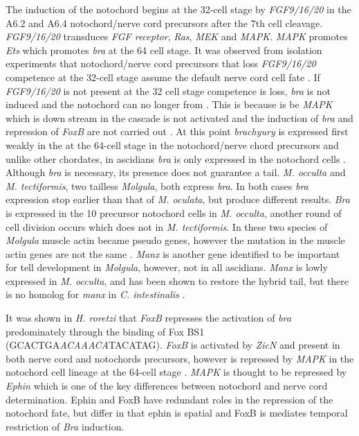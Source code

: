 The induction of the notochord begins at the 32-cell stage by \textit{FGF9/16/20} in the A6.2 and A6.4 notochord/nerve cord precursors\cite{satoh_ascidian_2001} after the 7th cell cleavage. \textit{FGF9/16/20} transduces \textit{FGF receptor}, \textit{Ras}, \textit{MEK} and \textit{MAPK}. \textit{MAPK} promotes \textit{Ets} which promotes \textit{bra} at the 64 cell stage. It was observed from isolation experiments that notochord/nerve cord precursors that loss \textit{FGF9/16/20} competence at the 32-cell stage assume the default nerve cord cell fate \cite{yasuo_conservation_1998,minokawa_binary_2001}. If \textit{FGF9/16/20} is not present at the 32 cell stage competence is loss, \textit{bra} is not induced and the notochord can no longer from \cite{nakatani_basic_1996,nakatani_duration_1999}. This is because is be \textit{MAPK} which is down stream in the cascade is not activated and the induction of \textit{bra} and repression of \textit{FoxB} are not carried out \cite{hashimoto_transcription_2011}. At this point \textit{brachyury} is expressed first weakly in the at the 64-cell stage in the notochord/nerve chord precursors \cite{yasuo_ascidian_1994} and unlike other chordates, in ascidians \textit{bra} is only expressed in the notochord cells \cite{yasuo_function_1993,corbo_characterization_1997,hotta_temporal_1999,takada_brachyury_2002}. Although \textit{bra} is necessary, its presence does not guarantee a tail. \textit{M. occulta} and \textit{M. tectiformis}, two tailless \textit{Molgula}, both express \textit{bra}. In both cases \textit{bra} expression stop earlier than that of \textit{M. oculata}, but produce different results. \textit{Bra} is expressed in the 10 precursor notochord cells in \textit{M. occulta}, another round of cell division occurs which does not in \textit{M. tectiformis}.  In these two species of \textit{Molgula} muscle actin became pseudo genes, however the mutation in the muscle actin genes are not the same \cite{swalla_novel_1993,jeffery_evolution_1999}. \textit{Manx} is another gene identified to be important for tell development in \textit{Molgula}, however, not in all ascidians. \textit{Manx} is lowly expressed in \textit{M. occulta}, and has been shown to restore the hybrid tail, but there is no homolog for \textit{manx} in \textit{C. intestinalis} \cite{swalla_requirement_1996,swalla_multigene_1999}. 
 
It was shown in \textit{H. roretzi} that \textit{FoxB} represses the activation of \textit{bra} predominately through the binding of Fox BS1 (GCACTGA\textit{ACAAACA}TACATAG). \textit{FoxB} is activated by \textit{ZicN} and present in both nerve cord and notochords precursors, however is repressed by \textit{MAPK} in the notochord cell lineage at the 64-cell stage \cite{hashimoto_transcription_2011}. \textit{MAPK} is thought to be repressed by \textit{Ephin} which is one of the key differences between notochord and nerve cord determination. Ephin and FoxB have redundant roles in the repression of the notochord fate, but differ in that ephin is spatial and FoxB is mediates temporal restriction of \textit{Bra} induction.
   
